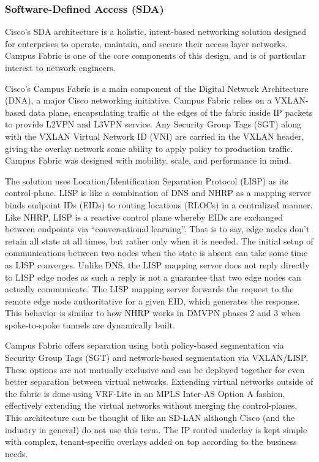 \subsubsection{Software-Defined Access (SDA)}
Cisco's SDA architecture is a holistic, intent-based networking solution
designed for enterprises to operate, maintain, and secure their access layer
networks. Campus Fabric is one of the core components of this design, and is
of particular interest to network engineers.

Cisco’s Campus Fabric is a main component of the Digital Network Architecture
(DNA), a major Cisco networking initiative. Campus Fabric relies on a
VXLAN-based data plane, encapsulating traffic at the edges of the fabric
inside IP packets to provide L2VPN and L3VPN service. Any Security Group Tags
(SGT) along with the VXLAN Virtual Network ID
(VNI) are carried in the VXLAN header, giving the overlay network some
ability to apply policy to production traffic. Campus Fabric was designed with
mobility, scale, and performance in mind.

The solution uses Location/Identification Separation Protocol (LISP) as its
control-plane. LISP is like a combination of DNS and NHRP as a mapping server
binds endpoint IDs (EIDs) to routing locations (RLOCs) in a centralized
manner. Like NHRP, LISP is a reactive control plane whereby EIDs are exchanged
between endpoints via ``conversational learning''. That is to say, edge nodes
don’t retain all state at all times, but rather only when it is needed. The
initial setup of communications between two nodes when the state is absent can
take some time as LISP converges. Unlike DNS, the LISP mapping server does not
reply directly to LISP edge nodes as such a reply is not a guarantee that two
edge nodes can actually communicate. The LISP mapping server forwards the
request to the remote edge node authoritative for a given EID, which generates
the response. This behavior is similar to how NHRP works in DMVPN phases 2 and
3 when spoke-to-spoke tunnels are dynamically built.

Campus Fabric offers separation using both policy-based segmentation via
Security Group Tags (SGT) and network-based segmentation via VXLAN/LISP\@. These
options are not mutually exclusive and can be deployed together for even
better separation between virtual networks. Extending virtual networks outside
of the fabric is done using VRF-Lite in an MPLS Inter-AS Option A fashion,
effectively extending the virtual networks without merging the control-planes.
This architecture can be thought of like an SD-LAN although Cisco (and the
industry in general) do not use this term. The IP routed underlay is kept
simple with complex, tenant-specific overlays added on top according to the
business needs.

